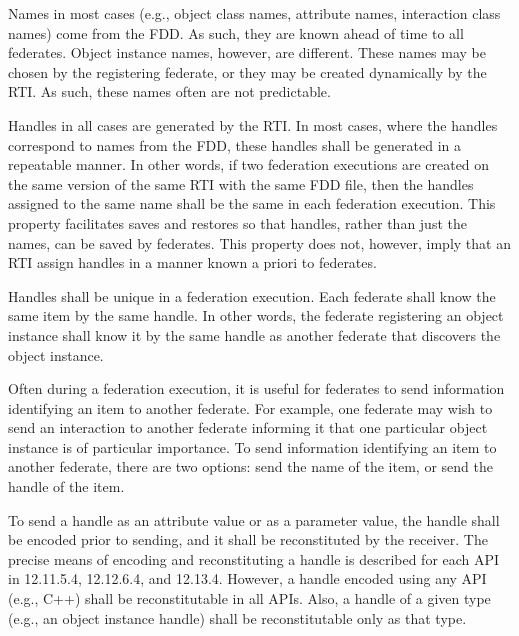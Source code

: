 \begin{compactstdpage}
    Names in most cases (e.g., object class names, attribute names, interaction class names) come from the FDD. As such, they are known ahead of time to all federates. Object instance names, however, are different. These names may be chosen by the registering federate, or they may be created dynamically by the RTI. As such, these names often are not predictable.

    Handles in all cases are generated by the RTI. In most cases, where the handles correspond to names from the FDD, these handles shall be generated in a repeatable manner. In other words, if two federation executions are created on the same version of the same RTI with the same FDD file, then the handles assigned to the same name shall be the same in each federation execution. This property facilitates saves and restores so that handles, rather than just the names, can be saved by federates. This property does not, however, imply that an RTI assign handles in a manner known a priori to federates.

    Handles shall be unique in a federation execution. Each federate shall know the same item by the same handle. In other words, the federate registering an object instance shall know it by the same handle as another federate that discovers the object instance.

    Often during a federation execution, it is useful for federates to send information identifying an item to another federate. For example, one federate may wish to send an interaction to another federate informing it that one particular object instance is of particular importance. To send information identifying an item to another federate, there are two options: send the name of the item, or send the handle of the item.

    To send a handle as an attribute value or as a parameter value, the handle shall be encoded prior to sending, and it shall be reconstituted by the receiver. The precise means of encoding and reconstituting a handle is described for each API in 12.11.5.4, 12.12.6.4, and 12.13.4. However, a handle encoded using any API (e.g., C++) shall be reconstitutable in all APIs. Also, a handle of a given type (e.g., an object instance handle) shall be reconstitutable only as that type.

\end{compactstdpage}

\clearpage

